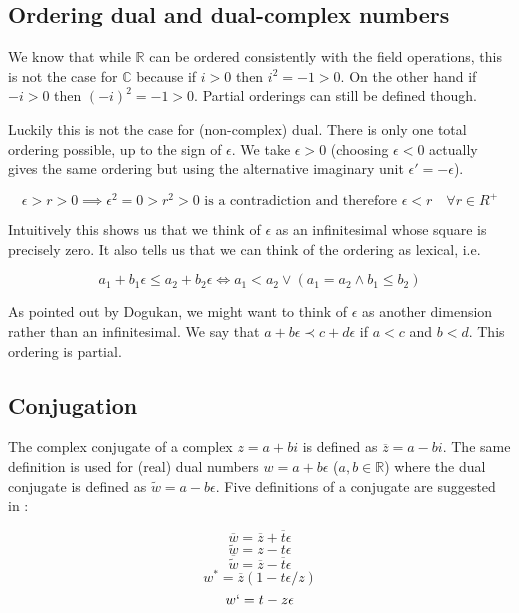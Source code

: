 \documentclass{article}
\newcommand{\R}{\mathbb{R}}
\newcommand{\C}{\mathbb{C}}
\newcommand{\e}{\epsilon}
\newcommand{\til}{\widetilde}
\renewcommand{\bar}{\overline}
\begin{document}
\subsection{Ordering dual and dual-complex numbers}

We know that while $\R$ can be ordered consistently with the field operations, this is not the case for $\C$ because if $i > 0$ then $i^2 = -1 > 0$. On the other hand if $-i > 0$ then $(-i)^2 = -1 > 0$. Partial orderings can still be defined though.

Luckily this is not the case for (non-complex) dual. There is only one total ordering possible, up to the sign of $\e$. We take $\e > 0$ (choosing $\e < 0$ actually gives the same ordering but using the alternative imaginary unit $\e' = -\e$).

\begin{equation}
\e > r > 0 \implies \e^2 = 0 > r^2 > 0 \text{ is a contradiction and therefore } \e < r \quad \forall r \in R^+
\end{equation}

Intuitively this shows us that we think of $\e$ as an infinitesimal whose square is precisely zero. It also tells us that we can think of the ordering as lexical, i.e.

\begin{equation}
a_1 + b_1 \e \leq a_2 + b_2 \e \iff a_1 < a_2 \lor (a_1 = a_2 \land b_1 \leq b_2)
\end{equation}

As pointed out by Dogukan, we might want to think of $\e$ as another dimension rather than an infinitesimal. We say that $a + b \e \prec c + d \e$ if $a < c$ and $b < d$. This ordering is partial.

\subsection{Conjugation}

The complex conjugate of a complex $z = a + bi$ is defined as $\bar{z} = a - bi$. The same definition is used for (real) dual numbers $w = a + b\e$ ($a, b \in \R$) where the dual conjugate is defined as $\til{w} = a - b \e$. Five definitions of a conjugate are suggested in \cite{messelmi2015}:

\begin{equation}
\bar{w} = \bar{z} + \bar{t}\e
\end{equation}
\begin{equation}
\til{w} = z - t\e
\end{equation}
\begin{equation}
\bar{\til{w}} = \bar{z} - \bar{t}\e
\end{equation}
\begin{equation}
w^* = \bar{z}(1-t\e/z)
\end{equation}
\begin{equation}
w` = t - z \e
\end{equation}
\end{document}
